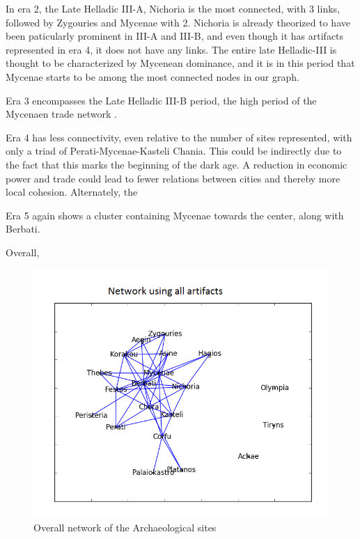 In era 2, the Late Helladic III-A, Nichoria is the most connected, with 3 links, followed by Zygouries and Mycenae with 2.  Nichoria is already theorized to have been paticularly prominent in III-A and III-B\cite{shelmerdine1981nichoria}, and even though it has artifacts represented in era 4, it does not have any links. The entire late Helladic-III is thought to be characterized by Mycenean dominance\cite{demand2011mediterranean}, and it is in this period that Mycenae starts to be among the most connected nodes in our graph. 

Era 3 encompasses the Late Helladic III-B period, the high period of the Mycenaen trade network \cite{demand2011mediterranean}. 

Era 4 has less connectivity, even relative to the number of sites represented, with only a triad of Perati-Mycenae-Kasteli Chania. This could be indirectly due to the fact that this marks the beginning of the dark age. A reduction in economic power and trade could lead to fewer relations between cities and thereby more local cohesion. Alternately, the 

Era 5 again shows a cluster containing Mycenae towards the center, along with Berbati. 

Overall, 

 
  




\begin{figure}
\includegraphics[width=\textwidth]{Overall_Network.png}
\caption{Overall network of the Archaeological sites}
\label{fig:overall}
\end{figure}


